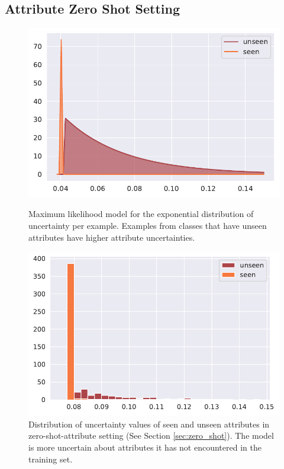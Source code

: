 \documentclass[a4paper,cleardoubleempty,BCOR1cm, 11pt]{report}
\begin{document}
\subsection{Attribute Zero Shot Setting}
\begin{figure}[t!]
	\centering
	\begin{minipage}[t]{0.45\textwidth}
		\centering
		\includegraphics[width=1\textwidth]{images/attr_zero_shot_class_uncertainty.pdf} 
		\caption{Maximum likelihood model for the exponential distribution of uncertainty per example. Examples from classes that have unseen attributes have higher attribute uncertainties.}
		\label{fig:unseen_attr_classes}
	\end{minipage}\hfill
	\begin{minipage}[t]{0.45\textwidth}
		\centering
		\includegraphics[width=1\textwidth]{images/attr_zero_shot_uncertainty_hist.pdf}
		\caption{Distribution of uncertainty values of seen and unseen attributes in zero-shot-attribute setting (See Section \ref{sec:zero_shot}). The model is more uncertain about attributes it has not encountered in the training set.}
		\label{fig:unseen_attrs}
	\end{minipage}
\end{figure}
\end{document}
